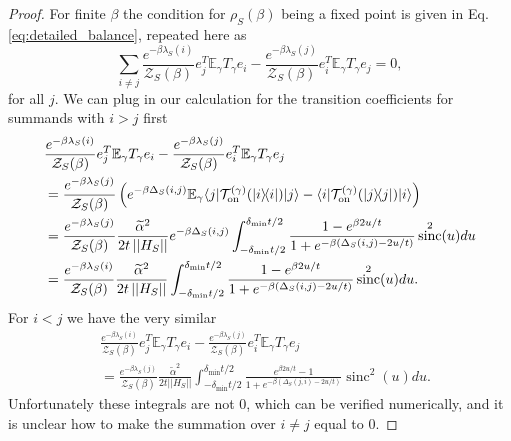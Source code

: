 \documentclass[
 amsmath,amssymb,
 aps,
onecolumn, 
nofootinbib]{revtex4-2}
\newcommand{\on}{\rm on}
\newcommand{\ket}[1]{|#1\rangle}
\newcommand{\bra}[1]{\langle #1|}
\newcommand{\ketbra}[2]{| #1\rangle\! \langle #2|}
\newcommand{\norm}[1]{\left|\left| #1 \right|\right|}
\newcommand{\EE}{\mathbb{E}}
\newcommand{\TT}{\mathcal{T}}
\newcommand{\partfun}{\mathcal{Z}}
\DeclareMathOperator{\sinc}{sinc}
\begin{document}
\begin{proof}
    For finite $\beta$ the condition for $\rho_S(\beta)$ being a fixed point is given in Eq. \eqref{eq:detailed_balance}, repeated here as
    \begin{equation}
        \sum_{i \neq j} \frac{e^{-\beta \lambda_S(i)}}{\partfun_S(\beta)} e_j^T \EE_\gamma T_\gamma e_i - \frac{e^{-\beta \lambda_S(j)}}{\partfun_S(\beta)}  e_i^T \EE_\gamma T_\gamma e_j = 0,
    \end{equation}
    for all $j$. We can plug in our calculation for the transition coefficients for summands with $i > j$ first
    \begin{align}
        &\frac{e^{-\beta \lambda_S(i)}}{\partfun_S(\beta)} e_j^T \EE_\gamma T_\gamma e_i - \frac{e^{-\beta \lambda_S(j)}}{\partfun_S(\beta)}  e_i^T \EE_\gamma T_\gamma e_j \nonumber \\ 
        &= \frac{e^{-\beta \lambda_S(j)}}{\partfun_S(\beta)} \left( e^{-\beta \Delta_S(i,j)} \EE_\gamma \bra{j} \TT_{\on}^{(\gamma)}(\ketbra{i}{i})\ket{j} - \bra{i} \TT_{\on}^{(\gamma)}(\ketbra{j}{j})\ket{i} \right) \\
        &= \frac{e^{-\beta \lambda_S(j)}}{\partfun_S(\beta)} \frac{\widetilde{\alpha}^2}{2 t \norm{H_S}} e^{-\beta \Delta_S(i,j)} \int_{-\delta_{\min} t /2 }^{\delta_{\min} t/ 2} \frac{1 - e^{\beta 2 u / t}}{1 + e^{-\beta(\Delta_S(i,j) - 2u/t)}} \sinc^2(u) du \\
        &= \frac{e^{-\beta \lambda_S(i)}}{\partfun_S(\beta)} \frac{\widetilde{\alpha}^2}{2 t \norm{H_S}} \int_{-\delta_{\min} t /2 }^{\delta_{\min} t/ 2} \frac{1 - e^{\beta 2 u / t}}{1 + e^{-\beta(\Delta_S(i,j) - 2u/t)}} \sinc^2(u) du. \label{eq:zero_knowledge_tmp_1}
    \end{align}
    For $i < j$ we have the very similar
    \begin{align}
        &\frac{e^{-\beta \lambda_S(i)}}{\partfun_S(\beta)} e_j^T \EE_\gamma T_\gamma e_i - \frac{e^{-\beta \lambda_S(j)}}{\partfun_S(\beta)}  e_i^T \EE_\gamma T_\gamma e_j \nonumber \\ 
        &= \frac{e^{-\beta \lambda_S(j)}}{\partfun_S(\beta)} \frac{\widetilde{\alpha}^2}{2 t \norm{H_S}} \int_{-\delta_{\min} t /2 }^{\delta_{\min} t/ 2} \frac{ e^{\beta 2 u / t} - 1}{1 + e^{-\beta(\Delta_S(j, i) - 2u/t)}} \sinc^2(u) du. \label{eq:zero_knowledge_tmp_2}
    \end{align}
    Unfortunately these integrals are not 0, which can be verified numerically, and it is unclear how to make the summation over $i \neq j$ equal to 0. 
    

\end{proof}
\end{document}
